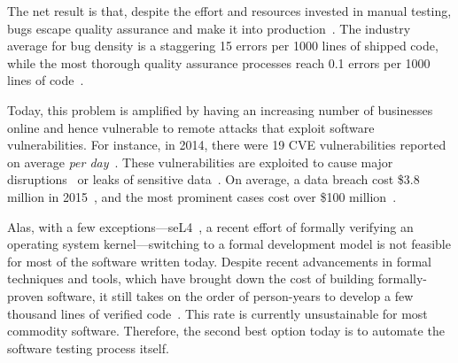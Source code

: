 The net result is that, despite the effort and resources invested in manual testing, bugs escape quality assurance and make it into production~\cite{redHatSecurityX}.
%
The industry average for bug density is a staggering 15 errors per 1000 lines of shipped code, while the most thorough quality assurance processes reach 0.1 errors per 1000 lines of code~\cite{codeComplete}.

Today, this problem is amplified by having an increasing number of businesses online and hence vulnerable to remote attacks that exploit software vulnerabilities.  For instance, in 2014, there were 19 CVE vulnerabilities reported on average \emph{per day}~\cite{nvd}.
%
These vulnerabilities are exploited to cause major disruptions~\cite{sony-hack} or leaks of sensitive data~\cite{sony-hack,psp-hack}.  On average, a data breach cost \$3.8 million in 2015~\cite{breach2015}, and the most prominent cases cost over \$100 million~\cite{target-hack}.




Alas, with a few exceptions---seL4~\cite{seL4}, a recent effort of formally verifying an operating system kernel---switching to a formal development model is not feasible for most of the software written today.
%
Despite recent advancements in formal techniques and tools, which have brought down the cost of building formally-proven software, it still takes on the order of person-years to develop a few thousand lines of verified code~\cite{seL4}.
%
This rate is currently unsustainable for most commodity software.
%
Therefore, the second best option today is to automate the software testing process itself.


